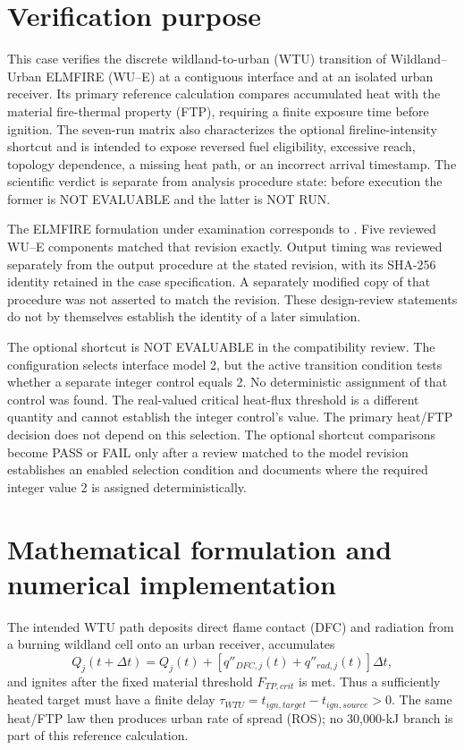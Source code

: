 \section{Verification purpose}

This case verifies the discrete
wildland-to-urban (WTU) transition of Wildland--Urban ELMFIRE (WU--E) at a contiguous interface and at
an isolated urban receiver. Its primary reference calculation compares accumulated heat with the material
fire-thermal property (FTP), requiring a finite exposure time before ignition. The seven-run matrix also characterizes the optional
fireline-intensity shortcut and is intended to expose reversed fuel
eligibility, excessive reach, topology dependence, a missing heat path, or an
incorrect arrival timestamp. The scientific verdict is separate from analysis procedure state:
before execution the former is NOT EVALUABLE and the latter is NOT RUN.

The ELMFIRE formulation under examination corresponds to \SourceCommit.
Five reviewed WU--E components matched that revision exactly. Output timing
was reviewed separately from the output procedure at the stated revision,
with its SHA-256 identity retained in the case specification. A separately
modified copy of that procedure was not asserted to match the revision.
These design-review statements do not by themselves establish the identity
of a later simulation.

The optional shortcut is NOT EVALUABLE in the compatibility review. The
configuration selects interface model 2, but the active transition condition
tests whether a separate integer control equals 2. No deterministic assignment
of that control was found. The real-valued critical heat-flux threshold is a
different quantity and cannot establish the integer control's value. The
primary heat/FTP decision does not depend on this selection. The optional
shortcut comparisons become PASS or FAIL only after a review matched to the
model revision establishes an enabled selection condition and documents where
the required integer value 2 is assigned deterministically.

\ReportOverview

\section{Mathematical formulation and numerical implementation}

The intended WTU path deposits direct flame contact (DFC) and radiation from a burning wildland cell
onto an urban receiver, accumulates
\[
 Q_j(t+\Delta t)=Q_j(t)+[q''_{DFC,j}(t)+q''_{rad,j}(t)]\Delta t,
\]
and ignites after the fixed material threshold $F_{TP,crit}$ is met. Thus a
sufficiently heated target must have a finite delay
$\tau_{WTU}=t_{ign,target}-t_{ign,source}>0$. The same heat/FTP law then
produces urban rate of spread (ROS); no 30,000-kJ branch is part of this reference calculation.

